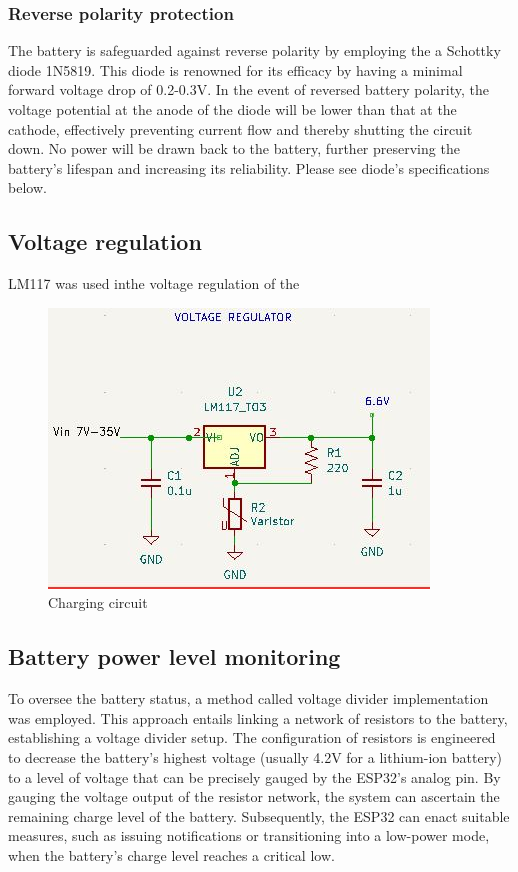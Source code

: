 \documentclass[class=report,11pt,crop=false]{standalone}
\begin{document}
	\subsubsection{Reverse polarity protection}
	\vspace{0.5cm}
	
	The battery is safeguarded against reverse polarity by employing the a Schottky diode 1N5819. This diode is renowned for its efficacy by having a minimal forward voltage drop of 0.2-0.3V. In the event of reversed battery polarity, the voltage potential at the anode of the diode will be lower than that at the cathode, effectively preventing current flow and thereby shutting the circuit down. No power will be drawn back to the battery, further preserving the battery's lifespan and increasing its reliability. Please see diode's specifications below.
	
	
	\subsection{Voltage regulation}
	LM117 was used inthe voltage regulation of the 
	
	
	\begin{figure}[h!]
		\centering
		\includegraphics[width=0.9\linewidth]{Figures/regulator.jpg}
		\caption{Charging circuit}
		\label{fig: P1}
	\end{figure}
	
	
	\subsection{Battery power level monitoring}
	To oversee the battery status, a method called voltage divider implementation was employed. This approach entails linking a network of resistors to the battery, establishing a voltage divider setup. The configuration of resistors is engineered to decrease the battery's highest voltage (usually 4.2V for a lithium-ion battery) to a level of voltage that can be precisely gauged by the ESP32's analog pin. By gauging the voltage output of the resistor network, the system can ascertain the remaining charge level of the battery. Subsequently, the ESP32 can enact suitable measures, such as issuing notifications or transitioning into a low-power mode, when the battery's charge level reaches a critical low.
	
\end{document}
